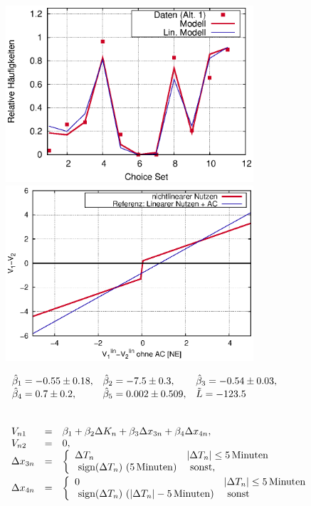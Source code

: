 \documentclass[a4paper]{foils}
\begin{document}
\begin{landscape}
\begin{center}
\vspace{3ex}

\parbox{1.39\textwidth}{
 \includegraphics[width=0.69\textwidth]
   {figsDiscr/nonlinUtility_statedChoiceWS1213_fProb.eps}
 \includegraphics[width=0.69\textwidth]
   {figsDiscr/nonlinUtility_statedChoiceWS1213_Vfun.eps}
}

\vspace{3ex}


 $
 \begin{array}{lll}
\hat{\beta}_1=-0.55 \pm 0.18, &
\hat{\beta}_2=-7.5 \pm 0.3, &
\hat{\beta}_3=-0.54 \pm 0.03, \\
\hat{\beta}_4=0.7 \pm 0.2, &
\hat{\beta}_5=0.002 \pm 0.509, &
\tilde{L}=-123.5
 \end{array}
 $


\newpage
\\[2ex]

{\small
$
\begin{array}{lll}
V_{n1} &=& \beta_1 + \beta_2 \Delta K_n 
+ \beta_3 \Delta x_{3n}+\beta_4 \Delta x_{4n},\\
V_{n2} &=& 0,\\
\Delta x_{3n} &=& \twoCases{\Delta T_n}{|\Delta T_n| \le \unit[5]{Minuten}}
 {\text{sign}(\Delta T_n) \ (\unit[5]{Minuten})}{\text{sonst,}} \\[2ex]
\Delta x_{4n} &=& \twoCases{0}{|\Delta T_n| \le \unit[5]{Minuten}}
 {\text{sign} (\Delta T_n) \ (|\Delta T_n|-\unit[5]{Minuten})}{\text{sonst}}
\end{array}
$
}


\end{center}
\end{landscape}
\end{document}
